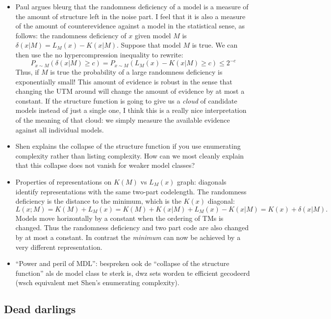 \documentclass{style/llncs}
\begin{document}
{\begin{itemize}
\item Paul argues bleurg that the randomness deficiency of a model is a measure of the amount of structure left in the noise part. I feel that it is also a measure of the amount of counterevidence against a model in the statistical sense, as follows: the randomness deficiency of $x$ given model $M$ is $\delta(x|M)=L_M(x)-K(x|M)$. Suppose that model $M$ is true. We can then use the no hypercompression inequality to rewrite:
%
\[
P_{x\sim M}(\delta(x|M)\ge c) = P_{x\sim M}(L_M(x) - K(x|M) \ge c)\le 2^{-c}
\]
Thus, if $M$ is true the probability of a large randomness deficiency is exponentially small! This amount of evidence is robust in the sense that changing the UTM around will change the amount of evidence by at most a constant. If the structure function is going to give us a \emph{cloud} of candidate models instead of just a single one, I think this is a really nice interpretation of the meaning of that cloud: we simply measure the available evidence against all individual models.  

\item Shen explains the collapse of the structure function if you use enumerating complexity rather than listing complexity. How can we most cleanly explain that this collapse does not vanish for weaker model classes?

\item Properties of representations on $K(M)$ vs $L_M(x)$ graph: diagonals identify representations with the same two-part codelength. The randomness deficiency is the distance to the minimum, which is the $K(x)$ diagonal:
\[L(x;M)=K(M)+L_M(x) =K(M)+K(x|M)+L_M(x)-K(x|M)  = K(x)+\delta(x|M).\]
 Models move horizontally by a constant when the ordering of TMs is changed. Thus the randomness deficiency and two part code are also changed by at most a constant. In contrast the \emph{minimum} can now be achieved by a very different representation.

\item ``Power and peril of MDL'': bespreken ook de ``collapse of the structure function'' als de model class te sterk is, dwz sets worden te efficient gecodeerd (wsch equivalent met Shen's enumerating complexity).

\end{itemize}

\subsection{Dead darlings}

}
\end{document}
